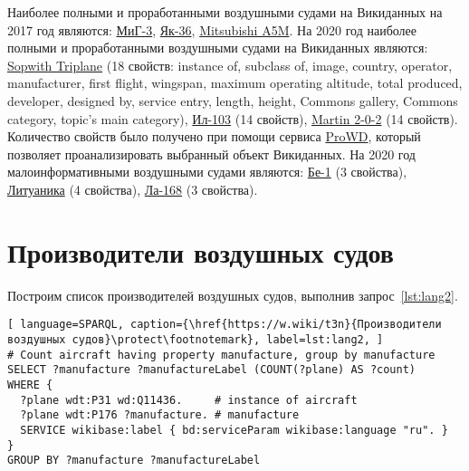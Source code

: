 
Наиболее полными и проработанными воздушными судами на Викиданных на 2017 год являются: \href{https://www.wikidata.org/wiki/Q271446}{МиГ-3}, \href{https://www.wikidata.org/wiki/Q1349098}{Як-36}, \href{https://www.wikidata.org/wiki/Q429839}{Mitsubishi A5M}. На 2020 год наиболее полными и проработанными воздушными судами на Викиданных являются: \href{https://www.wikidata.org/wiki/Q770863}{Sopwith Triplane} (18 свойств: instance of, subclass of, image, country, operator, manufacturer, first flight, wingspan, maximum operating altitude, total produced, developer, designed by, service entry, length, height, Commons gallery, Commons category, topic's main category), \href{https://www.wikidata.org/wiki/Q1658673}{Ил-103} (14 свойств), \href{https://www.wikidata.org/wiki/Q665071}{Martin 2-0-2} (14 свойств).
Количество свойств было получено при помощи сервиса \href{https://prowd.id/dashboards/972cd00ce110/profile}{ProWD}, который позволяет проанализировать выбранный объект Викиданных.
На 2020 год малоинформативными воздушными судами являются: \href{https://www.wikidata.org/wiki/Q820603}{Бе-1} (3 свойства), \href{https://www.wikidata.org/wiki/Q117984}{Литуаника} (4 свойства), \href{https://www.wikidata.org/wiki/Q572762}{Ла-168} (3 свойства).

\section{Производители воздушных судов}

Построим список производителей воздушных судов, выполнив запрос~\ref{lst:lang2}.


\begin{lstlisting}[ language=SPARQL, caption={\href{https://w.wiki/t3n}{Производители воздушных судов}\protect\footnotemark}, label=lst:lang2, ]
# Count aircraft having property manufacture, group by manufacture
SELECT ?manufacture ?manufactureLabel (COUNT(?plane) AS ?count) 
WHERE {
  ?plane wdt:P31 wd:Q11436.     # instance of aircraft
  ?plane wdt:P176 ?manufacture. # manufacture
  SERVICE wikibase:label { bd:serviceParam wikibase:language "ru". }
}
GROUP BY ?manufacture ?manufactureLabel
\end{lstlisting}


